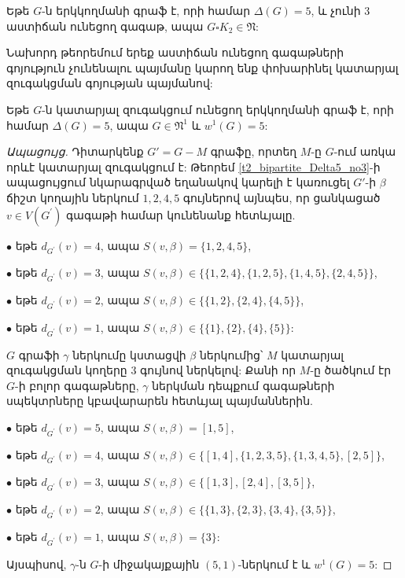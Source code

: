 \begin{corollary}
\label{c2_bipartite_Delta5_no3} Եթե $G$-ն երկկողմանի գրաֆ է, որի համար $\Delta(G) =
5$, և չունի $3$ աստիճան ունեցող գագաթ, ապա $G\square K_{2}\in \mathfrak{N}$:
\end{corollary}

Նախորդ թեորեմում երեք աստիճան ունեցող գագաթների գոյություն չունենալու պայմանը կարող ենք փոխարինել կատարյալ զուգակցման գոյության պայմանով:

\begin{theorem}
\label{t2_bipartite_Delta5_nopm} Եթե $G$-ն կատարյալ զուգակցում ունեցող երկկողմանի գրաֆ է, որի համար $\Delta(G)=5$, ապա $G\in \mathfrak{N}^{1}$ և
$w^{1}(G)=5$:
\end{theorem}
\begin{proof}[Ապացույց]
Դիտարկենք $G' = G - M$ գրաֆը, որտեղ $M$-ը $G$-ում առկա որևէ կատարյալ զուգակցում է: Թեորեմ \ref{t2_bipartite_Delta5_no3}-ի ապացույցում նկարագրված եղանակով կարելի է կառուցել $G'$-ի $\beta$ ճիշտ կողային ներկում $1,2,4,5$ գույներով այնպես, որ ցանկացած $v\in
V(G^{\prime})$ գագաթի համար կունենանք հետևյալը.

$\bullet$ եթե $d_{G^{\prime}}(v)=4$, ապա $S(v,\beta)=
\{1,2,4,5\}$,

$\bullet$ եթե $d_{G^{\prime}}(v)=3$, ապա
$S(v,\beta)\in \{\{1,2,4\},\{1,2,5\},\{1,4,5\},\{2,4,5\}\}$,

$\bullet$ եթե $d_{G^{\prime}}(v)=2$, ապա $S(v,\beta)\in
\{\{1,2\},\{2,4\},\{4,5\}\}$,

$\bullet$ եթե $d_{G^{\prime}}(v)=1$, ապա $S(v,\beta)\in
\{\{1\},\{2\},\{4\},\{5\}\}$:

$G$ գրաֆի $\gamma$ ներկումը կստացվի $\beta$ ներկումից՝ $M$ կատարյալ զուգակցման կողերը $3$ գույնով ներկելով: Քանի որ $M$-ը ծածկում էր $G$-ի բոլոր գագաթները, $\gamma$ ներկման դեպքում գագաթների սպեկտրները կբավարարեն հետևյալ պայմաններին.

$\bullet$ եթե $d_{G^{\prime}}(v)=5$, ապա $S(v,\beta)=
[1,5]$,

$\bullet$ եթե $d_{G^{\prime}}(v)=4$, ապա
$S(v,\beta)\in \{[1,4],\{1,2,3,5\},\{1,3,4,5\},[2,5]\}$,

$\bullet$ եթե $d_{G^{\prime}}(v)=3$, ապա $S(v,\beta)\in
\{[1,3],[2,4],[3,5]\}$,

$\bullet$ եթե $d_{G^{\prime}}(v)=2$, ապա $S(v,\beta)\in
\{\{1,3\},\{2,3\},\{3,4\},\{3,5\}\}$,

$\bullet$ եթե $d_{G^{\prime}}(v)=1$, ապա $S(v,\beta) = \{3\}$:

Այսպիսով, $\gamma$-ն $G$-ի միջակայքային $(5,1)$-ներկում է և $w^1(G)=5$:
\end{proof}

